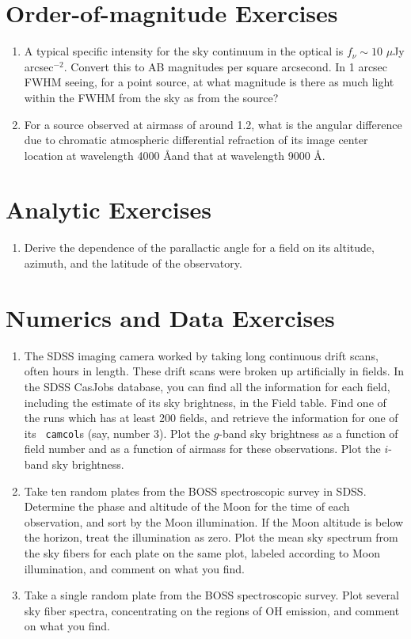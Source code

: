 \section{Order-of-magnitude Exercises}

\begin{enumerate} 
\item A typical specific intensity  for the sky continuum in the
    optical is $f_\nu \sim 10$ $\mu$Jy arcsec$^{-2}$. Convert this to
    AB magnitudes per square arcsecond. In 1 arcsec FWHM seeing, for a
    point source, at what magnitude is there as much light within the
    FWHM from the sky as from the source?
\item For a source observed at airmass of around 1.2, what is the
    angular difference due to chromatic atmospheric differential
    refraction of its image center location at wavelength 4000 \AA and
    that at wavelength 9000 \AA.
\end{enumerate} 

\section{Analytic Exercises}

\begin{enumerate}
\item Derive the dependence of the parallactic angle for a field on
    its altitude, azimuth, and the latitude of the observatory.
\end{enumerate}

\section{Numerics and Data Exercises}

\begin{enumerate}
\item The SDSS imaging camera worked by taking long continuous drift
scans, often hours in length. These drift scans were broken up
artificially in fields. In the SDSS CasJobs database, you can find all
the information for each field, including the estimate of its sky
brightness, in the Field table. Find one of the runs which has at
least 200 fields, and retrieve the information for one of its {\tt
camcol}s (say, number 3). Plot the $g$-band sky brightness as a
function of field number and as a function of airmass for these
observations. Plot the $i$-band sky brightness. 
\item Take ten random plates from the BOSS spectroscopic survey in
SDSS. Determine the phase and altitude of the Moon for the time of
each observation, and sort by the Moon illumination. If the Moon
altitude is below the horizon, treat the illumination as zero. Plot
the mean sky spectrum from the sky fibers for each plate on the same
plot, labeled according to Moon illumination, and comment on what you
find.
\item Take a single random plate from the BOSS spectroscopic
survey. Plot several sky fiber spectra, concentrating on the regions
of OH emission, and comment on what you find.
\end{enumerate}

